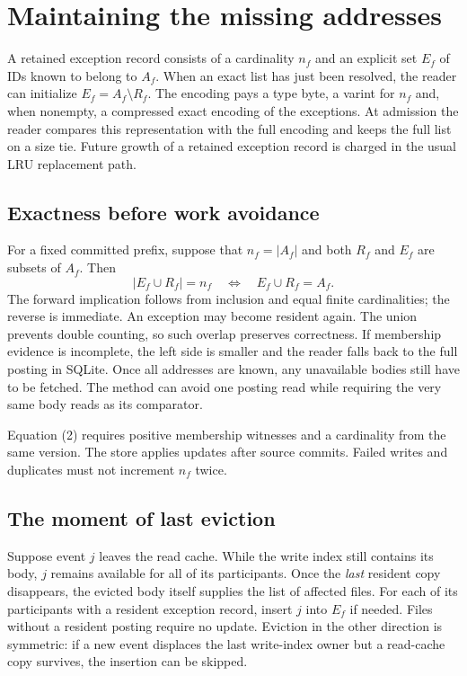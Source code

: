 \documentclass[conference]{IEEEtran}
\begin{document}
\section{Maintaining the missing addresses}
A retained exception record consists of a cardinality $n_f$ and an explicit set $E_f$ of IDs known to belong to $A_f$. When an exact list has just been resolved, the reader can initialize $E_f=A_f\setminus R_f$. The encoding pays a type byte, a varint for $n_f$ and, when nonempty, a compressed exact encoding of the exceptions. At admission the reader compares this representation with the full encoding and keeps the full list on a size tie. Future growth of a retained exception record is charged in the usual LRU replacement path.

\subsection{Exactness before work avoidance}
For a fixed committed prefix, suppose that $n_f=|A_f|$ and both $R_f$ and $E_f$ are subsets of $A_f$. Then
\begin{equation}
|E_f\cup R_f|=n_f\quad\Longleftrightarrow\quad E_f\cup R_f=A_f.
\end{equation}
The forward implication follows from inclusion and equal finite cardinalities; the reverse is immediate. An exception may become resident again. The union prevents double counting, so such overlap preserves correctness.  If membership evidence is incomplete, the left side is smaller and the reader falls back to the full posting in SQLite. Once all addresses are known, any unavailable bodies still have to be fetched. The method can avoid one posting read while requiring the very same body reads as its comparator.

Equation (2) requires positive membership witnesses and a cardinality from the same version. The store applies updates after source commits. Failed writes and duplicates must not increment $n_f$ twice.

\subsection{The moment of last eviction}
Suppose event $j$ leaves the read cache. While the write index still contains its body, $j$ remains available for all of its participants. Once the \emph{last} resident copy disappears, the evicted body itself supplies the list of affected files. For each of its participants with a resident exception record, insert $j$ into $E_f$ if needed. Files without a resident posting require no update. Eviction in the other direction is symmetric: if a new event displaces the last write-index owner but a read-cache copy survives, the insertion can be skipped.
\end{document}
